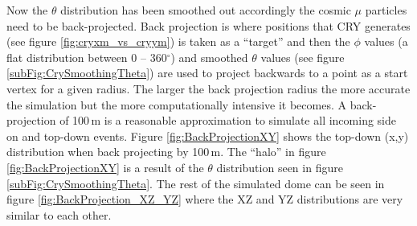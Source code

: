 Now the $\theta$ distribution has been smoothed out accordingly the cosmic $\mu$ particles need to be back-projected. Back projection is where positions that CRY generates (see figure \ref{fig:cryxm_vs_cryym}) is taken as a ``target'' and then the $\phi$ values (a flat distribution between 0 -- 360$^\circ$) and smoothed $\theta$ values (see figure \ref{subFig:CrySmoothingTheta}) are used to project backwards to a point as a start vertex for a given radius. The larger the back projection radius the more accurate the simulation but the more computationally intensive it becomes. A back-projection of 100\,m is a reasonable approximation to simulate all incoming side on and top-down events. Figure \ref{fig:BackProjectionXY} shows the top-down (x,y) distribution when back projecting by 100\,m. The ``halo'' in figure \ref{fig:BackProjectionXY} is a result of the $\theta$ distribution seen in figure \ref{subFig:CrySmoothingTheta}. The rest of the simulated dome can be seen in figure \ref{fig:BackProjection_XZ_YZ} where the XZ and YZ distributions are very similar to each other. 


